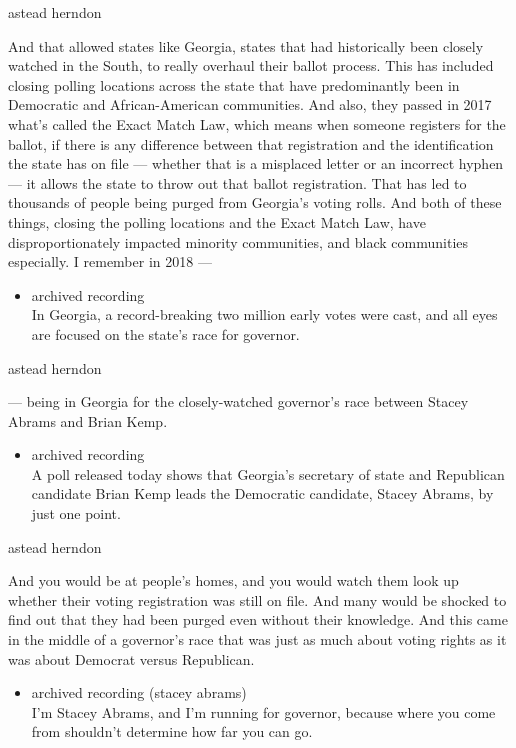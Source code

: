 astead herndon

And that allowed states like Georgia, states that had historically been
closely watched in the South, to really overhaul their ballot process.
This has included closing polling locations across the state that have
predominantly been in Democratic and African-American communities. And
also, they passed in 2017 what's called the Exact Match Law, which means
when someone registers for the ballot, if there is any difference
between that registration and the identification the state has on file
--- whether that is a misplaced letter or an incorrect hyphen --- it
allows the state to throw out that ballot registration. That has led to
thousands of people being purged from Georgia's voting rolls. And both
of these things, closing the polling locations and the Exact Match Law,
have disproportionately impacted minority communities, and black
communities especially. I remember in 2018 ---

\begin{itemize}
\tightlist
\item
  archived recording\\
  In Georgia, a record-breaking two million early votes were cast, and
  all eyes are focused on the state's race for governor.
\end{itemize}

astead herndon

--- being in Georgia for the closely-watched governor's race between
Stacey Abrams and Brian Kemp.

\begin{itemize}
\tightlist
\item
  archived recording\\
  A poll released today shows that Georgia's secretary of state and
  Republican candidate Brian Kemp leads the Democratic candidate, Stacey
  Abrams, by just one point.
\end{itemize}

astead herndon

And you would be at people's homes, and you would watch them look up
whether their voting registration was still on file. And many would be
shocked to find out that they had been purged even without their
knowledge. And this came in the middle of a governor's race that was
just as much about voting rights as it was about Democrat versus
Republican.

\begin{itemize}
\tightlist
\item
  archived recording (stacey abrams)\\
  I'm Stacey Abrams, and I'm running for governor, because where you
  come from shouldn't determine how far you can go.
\end{itemize}

